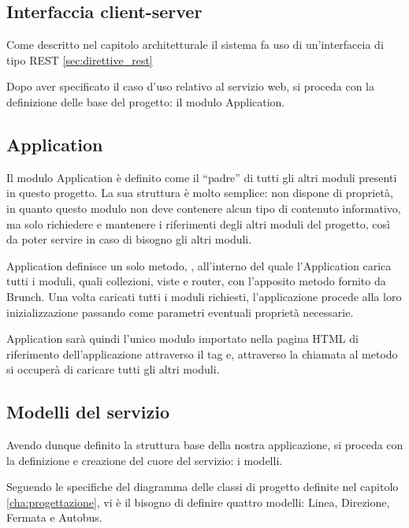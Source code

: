 \subsection{Interfaccia client-server} %
\label{sub:interfaccia_client_server}

Come descritto nel capitolo architetturale il sistema fa uso di un'interfaccia di tipo REST \ref{sec:direttive_rest}



Dopo aver specificato il caso d'uso relativo al servizio web, si proceda con la definizione delle base del progetto: il modulo Application.

\subsection{Application} %
\label{sub:application}

Il modulo Application è definito come il ``padre'' di tutti gli altri moduli presenti in questo progetto.
La sua struttura è molto semplice: non dispone di proprietà, in quanto questo modulo non deve contenere alcun tipo di contenuto informativo, ma solo richiedere e mantenere i riferimenti degli altri moduli del progetto, così da poter servire in caso di bisogno gli altri moduli.

Application definisce un solo metodo, , all'interno del quale l'Application carica tutti i moduli, quali collezioni, viste e router, con l'apposito metodo fornito da Brunch. Una volta caricati tutti i moduli richiesti, l'applicazione procede alla loro inizializzazione passando come parametri eventuali proprietà necessarie. 

Application sarà quindi l'unico modulo importato nella pagina HTML di riferimento dell'applicazione attraverso il tag  e, attraverso la chiamata al metodo  si occuperà di caricare tutti gli altri moduli.

\subsection{Modelli del servizio} %
\label{sub:modelli_del_servizio}

Avendo dunque definito la struttura base della nostra applicazione, si proceda con la definizione e creazione del cuore del servizio: i modelli.

Seguendo le specifiche del diagramma delle classi di progetto definite nel capitolo \ref{cha:progettazione}, vi è il bisogno di definire quattro modelli: Linea, Direzione, Fermata e Autobus.

